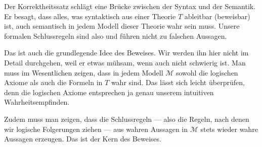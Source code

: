 \begin{math-stroke}

\begin{explanation-of-steps}
Der Korrektheitssatz schlägt eine Brücke zwischen der Syntax und der Semantik. Er besagt, dass alles, was syntaktisch aus einer Theorie $T$ ableitbar (beweisbar) ist, auch semantisch in jedem Modell dieser Theorie wahr sein muss. Unsere formalen Schlussregeln sind also  und führen nicht zu falschen Aussagen.
\end{explanation-of-steps}
\end{math-stroke}

\begin{spoken-clean}[00:20:06 - 00:22:28]
Das ist auch die grundlegende Idee des Beweises. Wir werden ihn hier nicht im Detail durchgehen, weil er etwas mühsam, wenn auch nicht schwierig ist. Man muss im Wesentlichen zeigen, dass in jedem Modell $\mathcal{M}$ sowohl die logischen Axiome als auch die Formeln in $T$ wahr sind. Das lässt sich leicht überprüfen, denn die logischen Axiome entsprechen ja genau unserem intuitiven Wahrheitsempfinden.

Zudem muss man zeigen, dass die Schlussregeln --- also die Regeln, nach denen wir logische Folgerungen ziehen --- aus wahren Aussagen in $\mathcal{M}$ stets wieder wahre Aussagen erzeugen. Das ist der Kern des Beweises.
\end{spoken-clean}

